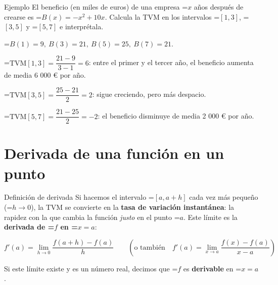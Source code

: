 \documentclass[11pt,a4paper]{article}
\newcommand{\fmm}[1]{\setbox0=\hbox{$#1$}\ifdim\wd0>\linewidth\[#1\]\else\mbox{\box0}\fi}
\begin{document}
  
\begin{fmex}{Ejemplo}
El beneficio (en miles de euros) de una empresa \fmm{x} años después de crearse es \fmm{B(x)=-x^2+10x}. Calcula la TVM en los intervalos \fmm{[1,3]}, \fmm{[3,5]} y \fmm{[5,7]} e interprétala.

 \vspace*{0.2cm}

        

\fmm{B(1)=9,\ B(3)=21,\ B(5)=25,\ B(7)=21}.

  
  \vspace*{0.2cm}      

\fmm{\text{TVM}[1,3]=\dfrac{21-9}{3-1}=6}: entre el primer y el tercer año, el beneficio aumenta de media 6 000 € por año.

\vspace*{0.2cm}
        

\fmm{\text{TVM}[3,5]=\dfrac{25-21}{2}=2}: sigue creciendo, pero más despacio.

        
        \vspace*{0.2cm}

\fmm{\text{TVM}[5,7]=\dfrac{21-25}{2}=-2}: el beneficio disminuye de media 2 000 € por año.
\end{fmex}

  
\section{Derivada de una función en un punto}\hypertarget{sec2}{}

  

  
\begin{fmdef}{Definición de derivada}
Si hacemos el intervalo \fmm{[a,a+h]} cada vez más pequeño (\fmm{h\to0}), la TVM se convierte en la \textbf{tasa de variación instantánea}: la rapidez con la que cambia la función \emph{justo} en el punto \fmm{a}. Este límite es la \textbf{derivada de \fmm{f} en \fmm{x=a}}:

      
\[f'(a)=\lim_{h\to0}\frac{f(a+h)-f(a)}{h}\qquad\left(\text{o también}\quad f'(a)=\lim_{x\to a}\frac{f(x)-f(a)}{x-a}\right)\]

      

Si este límite existe y es un número real, decimos que \fmm{f} es \textbf{derivable} en \fmm{x=a}.
\end{fmdef}
\end{document}
